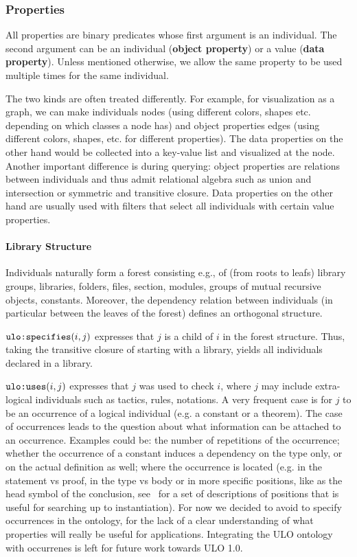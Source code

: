 \subsubsection{Properties}\label{sec:objprops}

All properties are binary predicates whose first argument is an individual.
The second argument can be an individual (\textbf{object property}) or a value (\textbf{data property}).
Unless mentioned otherwise, we allow the same property to be used multiple times for the same individual.

The two kinds are often treated differently.
For example, for visualization as a graph, we can make individuals nodes (using different colors, shapes etc. depending on which classes a node has) and object properties edges (using different colors, shapes, etc. for different properties).
The data properties on the other hand would be collected into a key-value list and visualized at the node.
Another important difference is during querying: object properties are relations between individuals and thus admit relational algebra such as union and intersection or symmetric and transitive closure.
Data properties on the other hand are usually used with filters that select all individuals with certain value properties.

\paragraph{Library Structure}
Individuals naturally form a forest consisting e.g., of (from roots to leafs) library groups, libraries, folders, files, section, modules, groups of mutual recursive objects, constants.
Moreover, the dependency relation between individuals (in particular between the leaves of the forest) defines an orthogonal structure.

$\ind{specifies}(i,j)${\isabelle\coq} expresses that $j$ is a child of $i$ in the forest structure.
Thus, taking the transitive closure of  starting with a library, yields all individuals declared in a library.

$\ind{uses}(i,j)${\isabelle\coq} expresses that $j$ was used to check $i$, where $j$ may include extra-logical individuals such as tactics, rules, notations.
A very frequent case is for $j$ to be an occurrence of a logical individual (e.g. a constant or a theorem). The case of occurrences leads to the question about what information can be attached to an occurrence. Examples could be: the number of repetitions of the occurrence; whether the occurrence of a constant induces a dependency on the type only, or on the actual definition as well; where the occurrence is located (e.g. in the statement vs proof, in the type vs body or in more specific positions, like as the head symbol of the conclusion, see~\cite{AGSTZ:ContMathSearchWhelp04} for a set of descriptions of positions that is useful for searching up to instantiation). For now we decided to avoid to specify occurrences in the ontology, for the lack of a clear understanding of what properties will really be useful for applications. Integrating the ULO ontology with occurrenes is left for future work towards ULO 1.0.

